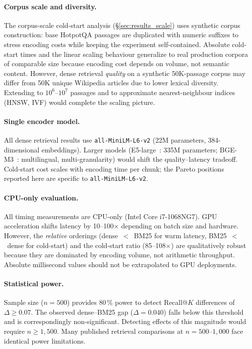 \documentclass[11pt,a4paper]{article}
\begin{document}
\paragraph{Corpus scale and diversity.}
The corpus-scale cold-start analysis (\S\ref{sec:results_scale}) uses
synthetic corpus construction: base HotpotQA passages are duplicated with
numeric suffixes to stress encoding costs while keeping the experiment
self-contained.
Absolute cold-start times and the linear scaling behaviour generalize to real
production corpora of comparable size because encoding cost depends on volume,
not semantic content.
However, dense retrieval \emph{quality} on a synthetic 50K-passage corpus may
differ from 50K unique Wikipedia articles due to lower lexical diversity.
Extending to $10^6$--$10^7$ passages and to approximate nearest-neighbour
indices (HNSW, IVF) would complete the scaling picture.

\paragraph{Single encoder model.}
All dense retrieval results use \texttt{all-MiniLM-L6-v2} (22M parameters,
384-dimensional embeddings).
Larger models (E5-large~\citep{wang2024text}: 335M parameters;
BGE-M3~\citep{chen2024bge}: multilingual, multi-granularity) would shift the
quality--latency tradeoff.
Cold-start cost scales with encoding time per chunk; the Pareto positions
reported here are specific to \texttt{all-MiniLM-L6-v2}.

\paragraph{CPU-only evaluation.}
All timing measurements are CPU-only (Intel Core i7-1068NG7).
GPU acceleration shifts latency by 10--100$\times$ depending on batch size and
hardware.
However, the \emph{relative} orderings (dense~$<$~BM25 for warm latency,
BM25~$<$~dense for cold-start) and the cold-start ratio (85--108$\times$) are
qualitatively robust because they are dominated by encoding volume, not
arithmetic throughput.
Absolute millisecond values should not be extrapolated to GPU deployments.

\paragraph{Statistical power.}
Sample size ($n=500$) provides 80\,\% power to detect Recall@$K$ differences of
$\Delta \geq 0.07$.
The observed dense--BM25 gap ($\Delta = 0.040$) falls below this threshold and
is correspondingly non-significant.
Detecting effects of this magnitude would require $n \geq 1{,}500$.
Many published retrieval comparisons at $n = 500$--$1{,}000$ face identical
power limitations.
\end{document}
